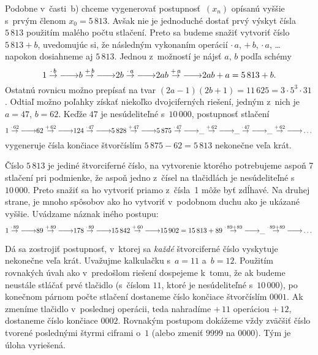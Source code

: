 {\smallskip
Podobne v~časti~b) chceme vygenerovať postupnosť~$(x_n)$ opísanú vyššie s~prvým členom $x_0=5\,813$. Avšak nie je jednoduché dostať prvý výskyt čísla  $5\,813$ použitím  malého počtu stlačení. Preto sa budeme snažiť vytvoriť číslo $5\,813+b$, uvedomujúc si, že následným vykonaním operácií $\cdot\,a$, $+\,b$, $\cdot\,a$, \dots{} napokon dosiahneme aj $5\,813$. Jednou z~možností je nájsť $a$, $b$ podľa schémy
$$
1\stepk{b} b \stepp{b} 2b \stepk{a} 2ab \stepp{a} 2ab+a=5\,813+b.
$$
Ostatnú rovnicu možno prepísať na tvar $(2a-1)(2b+1)=11\,625=3\cdot5^3\cdot31$. Odtiaľ možno poľahky získať niekoľko dvojciferných riešení, jedným z~nich je $a=47$, $b=62$. Keďže $47$ je nesúdeliteľné s~$10\,000$, postupnosť stlačení
$$
1\stepk{62} 62 \stepp{62} 124 \stepk{47} 5\,828 \stepp{47} 5\,875 \stepk{47} \_ \stepp{62} \_ \stepk{47} \_ \stepp{62} \dots
$$
vygeneruje čísla končiace štvorčíslím $5\,875-62=5\,813$ nekonečne veľa krát.

\poznamka
Číslo $5\,813$ je jediné štvorciferné číslo, na vytvorenie ktorého potrebujeme aspoň 7 stlačení pri podmienke, že aspoň jedno z~čísel na tlačidlách je nesúdeliteľné s~$10\,000$. Preto snažiť sa ho vytvoriť priamo z~čísla~1 môže byť zdĺhavé. Na druhej strane, je mnoho spôsobov ako ho vytvoriť v~podobnom duchu ako je ukázané vyššie. Uvádzame náznak iného postupu:
$$
1\stepk{89} 89 \stepp{89} 178 \stepk{89} 15\,842 \stepp{60} 15\,902=15\,813+89 \stepk{89+89}\_\stepk{89+89}\dots
$$

\ineriesenie
Dá sa zostrojiť postupnosť, v~ktorej sa {\it každé\/} štvorciferné číslo vyskytuje nekonečne veľa krát. Uvažujme kalkulačku s~$a=11$ a~$b=12$. Použitím rovnakých úvah ako v~predošlom riešení dospejeme k~tomu, že ak budeme neustále stláčať prvé tlačidlo (s~číslom $11$, ktoré je nesúdeliteľné s~$10\,000$), po konečnom párnom počte stlačení dostaneme číslo končiace štvorčíslím $0001$. Ak zmeníme tlačidlo v~poslednej operácii, teda nahradíme $+\,11$ operáciou $+\,12$, dostaneme číslo končiace $0002$. Rovnakým postupom dokážeme vždy zväčšiť číslo tvorené poslednými štyrmi ciframi o~$1$ (alebo zmeniť $9999$ na $0000$). Tým je úloha vyriešená.
}

